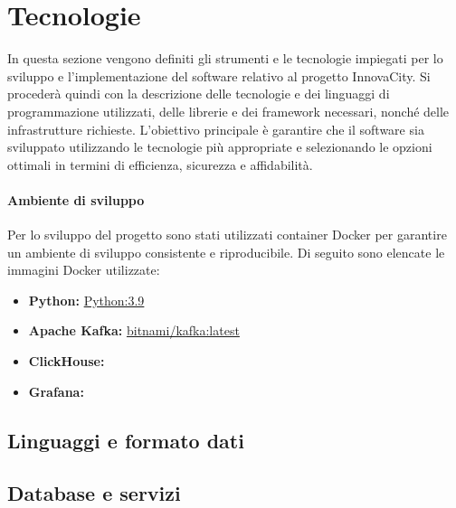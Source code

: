 \section{Tecnologie}
In questa sezione vengono definiti gli strumenti e le tecnologie impiegati per lo sviluppo e l'implementazione del software relativo al progetto InnovaCity. Si procederà quindi con la descrizione delle tecnologie e dei linguaggi di programmazione utilizzati, delle librerie e dei framework necessari, nonché delle infrastrutture richieste. L'obiettivo principale è garantire che il software sia sviluppato utilizzando le tecnologie più appropriate e selezionando le opzioni ottimali in termini di efficienza, sicurezza e affidabilità.

\paragraph*{Ambiente di sviluppo}
Per lo sviluppo del progetto sono stati utilizzati container Docker per garantire un ambiente di sviluppo consistente e riproducibile. Di seguito sono elencate le immagini Docker utilizzate:

\begin{itemize}
  \item \textbf{Python:} \href{https://hub.docker.com/_/python}{Python:3.9}
  \item \textbf{Apache Kafka:} \href{https://hub.docker.com/layers/bitnami/kafka/latest/images/sha256-4894d89d28f8e06a7d8a064efdc2dc9cb61dd205721c61296b6d033ad4824a91?context=explore}{bitnami/kafka:latest}
  \item \textbf{ClickHouse:} 
  \item \textbf{Grafana:} 
\end{itemize}
\subsection{Linguaggi e formato dati}



\subsection{Database e servizi}





